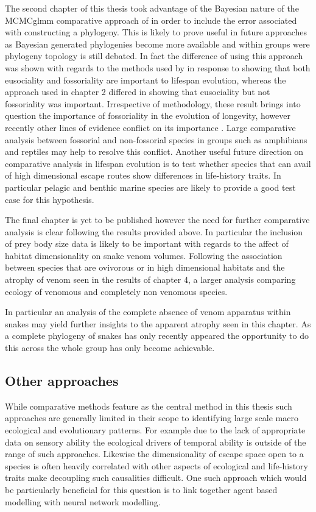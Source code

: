 The second chapter of this thesis took advantage of the Bayesian nature of the MCMCglmm comparative approach of \citep{hadfield2010mcmc} in order to include the error associated with constructing a phylogeny. This is likely to prove useful in future approaches as Bayesian generated phylogenies become more available and within groups were phylogeny topology is still debated. In fact the difference of using this approach was shown with regards to the methods used by \cite{williams2015ecology} in response to \cite{healy2014ecology} showing that both eusociality and fossoriality are important to lifespan evolution, whereas the approach used in chapter 2 differed in showing that eusociality but not fossoriality was important. Irrespective of methodology, these result brings into question the importance of fossoriality in the evolution of longevity, however recently other lines of evidence conflict on its importance \citep{faulkes2015molecular}. Large comparative analysis between fossorial and non-fossorial species in groups such as amphibians and reptiles may help to resolve this conflict. Another useful future direction on comparative analysis in lifespan evolution is to test whether species that can avail of high dimensional escape routes show differences in life-history traits. In particular pelagic and benthic marine species are likely to provide a good test case for this hypothesis. 


The final chapter is yet to be published however the need for further comparative analysis is clear following the results provided above. In particular the inclusion of prey body size data is likely to be important with regards to the affect of habitat dimensionality on snake venom volumes. Following the association between species that are ovivorous or in high dimensional habitats and the atrophy of venom seen in the results of chapter 4, a larger analysis comparing ecology of venomous and completely non venomous species. 

 In particular an analysis of the complete absence of venom apparatus within snakes may yield further insights to the apparent atrophy seen in this chapter. As a complete phylogeny of snakes has only recently appeared the opportunity to do this across the whole group has only become achievable. 

\subsection{Other approaches}

While comparative methods feature as the central method in this thesis such approaches are generally limited in their scope to identifying large scale macro ecological and evolutionary patterns. For example due to the lack of appropriate data on sensory ability the ecological drivers of temporal ability is outside of the range of such approaches. Likewise the dimensionality of escape space open to a species is often heavily correlated with other aspects of ecological and life-history traits make decoupling such causalities difficult. One such approach which would be particularly beneficial for this question is to link together agent based modelling with neural network modelling. 


